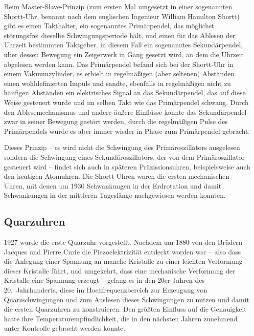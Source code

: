 Beim Master-Slave-Prinzip (zum ersten Mal umgesetzt in einer sogenannten 
Shortt-Uhr, benannt nach dem
englischen Ingenieur William Hamilton Shortt) gibt es einen
Takthalter, ein sogenanntes Prim\"arpendel, das m\"oglichst st\"orungsfrei dieselbe Schwingungsperiode h\"alt, und
einen f\"ur das Ablesen der Uhrzeit bestimmten Taktgeber, in diesem Fall ein sogenanntes Sekund\"arpendel, \"uber
dessen Bewegung ein Zeigerwerk in Gang gesetzt wird, an dem die Uhrzeit abgelesen werden kann. 
Das Prim\"arpendel befand sich bei der Shortt-Uhr in einem Vakuumzylinder, es erhielt in regelm\"a\ss igen
(aber seltenen) Abst\"anden einen wohldefinierten Impuls und sandte, ebenfalls in regelm\"a\ss igen nicht zu
h\"aufigen Abst\"anden ein elektrisches Signal an das Sekund\"arpendel, das auf diese Weise gesteuert wurde
und im selben Takt wie das Prim\"arpendel schwang. Durch den Ablesemechanismus und andere \"au\ss ere
Einfl\"usse konnte das Sekund\"arpendel zwar in seiner Bewegung gest\"ort werden, durch die regelm\"a\ss igen
Pulse des Prim\"arpendels wurde es aber immer wieder in Phase zum Prim\"arpendel gebracht. 

Dieses Prinzip -- es wird nicht die Schwingung des Prim\"aroszillators ausgelesen sondern die Schwingung
eines Sekund\"aroszillators, der von dem Prim\"aroszillator gesteuert wird -- findet sich auch in sp\"ateren 
Pr\"azissionsuhren, beispielsweise auch den heutigen Atomuhren. Die Shortt-Uhren waren die ersten
mechanischen Uhren, mit denen um 1930 Schwankungen in der Erdrotation und damit Schwankungen in der
mittleren Tagesl\"ange nachgewiesen werden konnten. 

\subsection{Quarzuhren}

1927 wurde die erste Quarzuhr 
vorgestellt. Nachdem um 1880 von den Br\"udern Jacques und
Pierre Curie die Piezoelektrizit\"at entdeckt worden war -- also dass die Anlegung einer Spannung
an manche Kristalle zu einer leichten Verformung dieser Kristalle f\"uhrt, und umgekehrt, dass eine mechanische
Verformung der Kristalle eine Spannung erzeugt -- gelang es in den 20er Jahren des 20.\ Jahrhunderts,
diese im Hochfrequenzbereich zur Erzeugung von Quarzschwingungen und zum Auslesen dieser
Schwingungen zu nutzen und damit die ersten Quarzuhren zu konstruieren. Den gr\"o\ss ten Einfluss
auf die Genauigkeit hatte ihre Temperaturempfindlichkeit, die in den n\"achsten Jahren zunehmend unter
Kontrolle gebracht werden konnte.  

